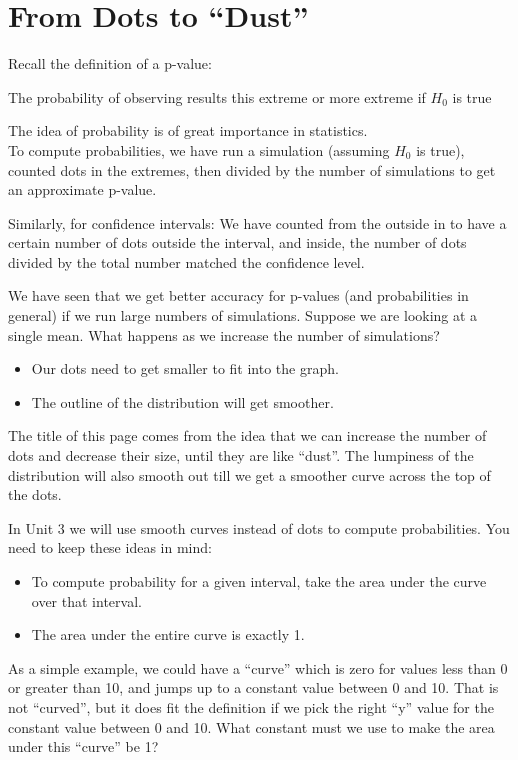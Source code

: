\def\theTopic{Reading 17}

\section{ From Dots to ``Dust''}


Recall the definition of a p-value:

{\sf The probability of observing results this extreme or more extreme
  if $H_0$ is true}

The idea of probability is of great importance in statistics.\\
To compute probabilities, we have run a simulation (assuming $H_0$ is
true), counted dots in the extremes, then divided by the number of
simulations to get an approximate p-value.

Similarly, for confidence intervals:  We have counted from the outside
in to have a certain number of dots outside the interval, and inside,
the number of dots divided by the total number matched the confidence
level.  


We have  seen that we get better accuracy for p-values (and
probabilities in general) if we run large numbers of simulations.
Suppose we are looking at a single mean. What happens as we increase
the number of simulations?
\begin{itemize}
  \item Our dots need to get smaller to fit into the graph.
  \item The outline of the distribution will get smoother.
\end{itemize}

The title of this page comes from the idea that we can increase the
number of dots and decrease their size, until they are like ``dust''. 
The lumpiness of the distribution will also smooth out till we get a
smoother curve across the top of the dots.

In Unit 3 we will use smooth curves instead of dots to
compute probabilities. You need to keep these ideas in mind:
\begin{itemize}
  \item To compute probability for a given interval, take the area
    under the curve over that interval.
  \item The area under the entire curve is exactly 1.
\end{itemize}


As a simple example, we could have a ``curve'' which is zero for
values less than 0 or greater than 10, and jumps up to a constant
value between 0 and 10.  That is not ``curved'', but it does fit the
definition if we pick the right ``y'' value for the constant value
between 0 and 10.  What constant must we use to make the area under
this ``curve'' be 1? 


